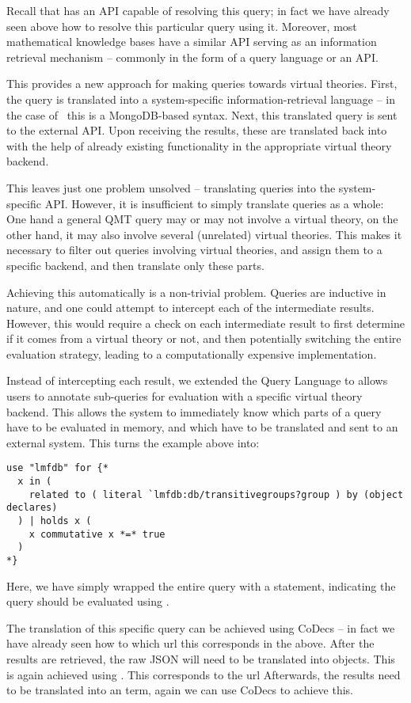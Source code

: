 Recall that \lmfdb has an API capable of resolving this query; in fact we have already seen above how to resolve this particular query using it. 
Moreover, most mathematical knowledge bases have a similar API serving as an information retrieval mechanism -- commonly in the form of a query language or an API. 

This provides a new approach for making queries towards virtual theories. 
First, the \mmt query is translated into a system-specific information-retrieval language -- in the case of \lmfdb\ this is a MongoDB-based syntax.
Next, this translated query is sent to the external API. 
Upon receiving the results, these are translated back into \ommt with the help of already existing functionality in the appropriate virtual theory backend.

This leaves just one problem unsolved -- translating queries into the system-specific API. 
However, it is insufficient to simply translate queries as a whole: 
One hand a general QMT query may or may not involve a virtual theory, on the other hand, it may also involve several (unrelated) virtual theories. 
This makes it necessary to filter out queries involving virtual theories, and assign them to a specific backend, and then translate only these parts. 

Achieving this automatically is a non-trivial problem. 
Queries are inductive in nature, and one could attempt to intercept each of the intermediate results. 
However, this would require a check on each intermediate result to first determine if it comes from a virtual theory or not, and then potentially switching the entire evaluation strategy, leading to a computationally expensive implementation. 

Instead of intercepting each result, we extended the Query Language to allows users to annotate sub-queries for evaluation with a specific virtual theory backend. 
This allows the system to immediately know which parts of a query have to be evaluated in \mmt memory, and which have to be translated and sent to an external system. 
This turns the example above into:
\begin{lstlisting}[language=qmt]
use "lmfdb" for {*
  x in (
    related to ( literal `lmfdb:db/transitivegroups?group ) by (object declares)
  ) | holds x (
    x commutative x *=* true
  )
*}
\end{lstlisting}
Here, we have simply wrapped the entire query with a  statement, indicating the query should be evaluated using \lmfdb. 

The translation of this specific query can be achieved using CoDecs -- in fact we have already seen how to which url this corresponds in the above. 
After the results are retrieved, the raw JSON will need to be translated into \ommt objects. 
This is again achieved using \ommt. 
This corresponds to the url 
Afterwards, the results need to be translated into an \ommt term, again we can use CoDecs to achieve this. 